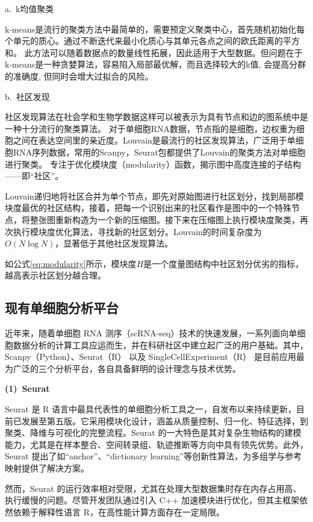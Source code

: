a.~k均值聚类

k-means是流行的聚类方法中最简单的，需要预定义聚类中心，首先随机初始化每个单元的质心。通过不断迭代来最小化质心与其单元各点之间的欧氏距离的平方和。
此方法可以随着数据点的数量线性拓展，因此适用于大型数据。但问题在于k-means是一种贪婪算法，容易陷入局部最优解，而且选择较大的k值, 会提高分群的准确度, 但同时会增大过拟合的风险。

b.~社区发现

社区发现算法在社会学和生物学数据这样可以被表示为具有节点和边的图系统中是一种十分流行的聚类算法。
对于单细胞RNA数据，节点指的是细胞，边权重为细胞之间在表达空间里的亲近度。Louvain是最流行的社区发现算法，广泛用于单细胞RNA序列数据，常用的Scanpy，Seurat包都提供了Louvain的聚类方法对单细胞进行聚类。
专注于优化模块度（modularity）函数，揭示图中高度连接的子结构——即“社区”。

Louvain递归地将社区合并为单个节点，即先对原始图进行社区划分，找到局部模块度最优的社区结构，接着，把每一个识别出来的社区看作是图中的一个特殊节点，将整张图重新构造为一个新的压缩图。接下来在压缩图上执行模块度聚类，再次执行模块度优化算法，寻找新的社区划分。Louvain的时间复杂度为$O(N \log N)$，显著低于其他社区发现算法。



如公式\ref{eq:modularity}所示，模块度$H$是一个度量图结构中社区划分优劣的指标，越高表示社区划分越合理。

\subsection{现有单细胞分析平台}

近年来，随着单细胞 RNA 测序（scRNA-seq）技术的快速发展，一系列面向单细胞数据分析的计算工具应运而生，并在科研社区中建立起广泛的用户基础。其中，Scanpy（Python）、Seurat（R） 以及 SingleCellExperiment（R） 是目前应用最为广泛的三个分析平台，各自具备鲜明的设计理念与技术优势。

\textbf{(1)~Seurat}

Seurat\supercite{hao_integrated_2021,hao_dictionary_2024} 是 R 语言中最具代表性的单细胞分析工具之一，自发布以来持续更新，目前已发展至第五版。它采用模块化设计，涵盖从质量控制、归一化、特征选择，到聚类、降维与可视化的完整流程。Seurat 的一大特色是其对复杂生物结构的建模能力，尤其是在样本整合、空间转录组、轨迹推断等方向中具有领先优势。此外，Seurat 提出了如“anchor”、“dictionary learning”等创新性算法，为多组学与参考映射提供了解决方案。

然而，Seurat 的运行效率相对受限，尤其在处理大型数据集时存在内存占用高、执行缓慢的问题。尽管开发团队通过引入 C++ 加速模块进行优化，但其主框架依然依赖于解释性语言 R，在高性能计算方面存在一定局限。

